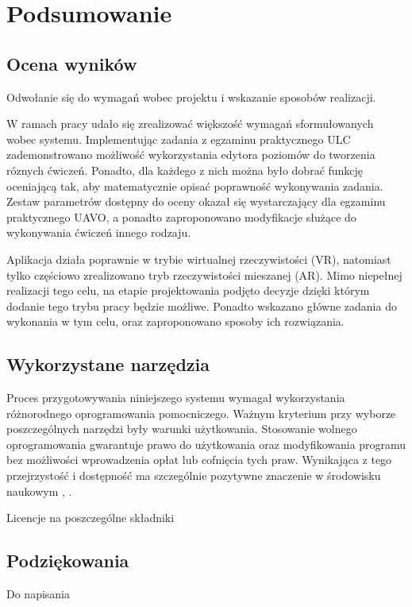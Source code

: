 \newpage
\section{Podsumowanie}

\subsection{Ocena wyników}
\begin{todo}
    Odwołanie się do wymagań wobec projektu i wskazanie sposobów realizacji.
\end{todo}
W ramach pracy udało się zrealizować większość wymagań sformułowanych wobec systemu. Implementując zadania z egzaminu praktycznego ULC zademonstrowano możliwość wykorzystania edytora poziomów do tworzenia róznych ćwiczeń. Ponadto, dla każdego z nich można było dobrać funkcję oceniającą tak, aby matematycznie opisać poprawność wykonywania zadania. Zestaw parametrów dostępny do oceny okazał się wystarczający dla egzaminu praktycznego UAVO, a ponadto zaproponowano modyfikacje służące do wykonywania ćwiczeń innego rodzaju.

Aplikacja działa poprawnie w trybie wirtualnej rzeczywistości (VR), natomiast tylko częściowo zrealizowano tryb rzeczywistości mieszanej (AR). Mimo niepełnej realizacji tego celu, na etapie projektowania podjęto decyzje dzięki którym dodanie tego trybu pracy będzie możliwe. Ponadto wskazano główne zadania do wykonania w tym celu, oraz zaproponowano sposoby ich rozwiązania.

\subsection{Wykorzystane narzędzia}
Proces przygotowywania niniejszego systemu wymagał wykorzystania różnorodnego oprogramowania pomocniczego. Ważnym kryterium przy wyborze poszczególnych narzędzi były warunki użytkowania. Stosowanie wolnego oprogramowania gwarantuje prawo do użytkowania oraz modyfikowania programu bez możliwości wprowadzenia opłat lub cofnięcia tych praw. Wynikająca z tego przejrzystość i dostępność ma szczególnie pozytywne znaczenie w środowisku naukowym \cite{courant2006}, \cite{lakhan2008}.

\begin{todo}
    Licencje na poszczególne składniki
\end{todo}

\subsection{Podziękowania}
\begin{todo}
    Do napisania
\end{todo}